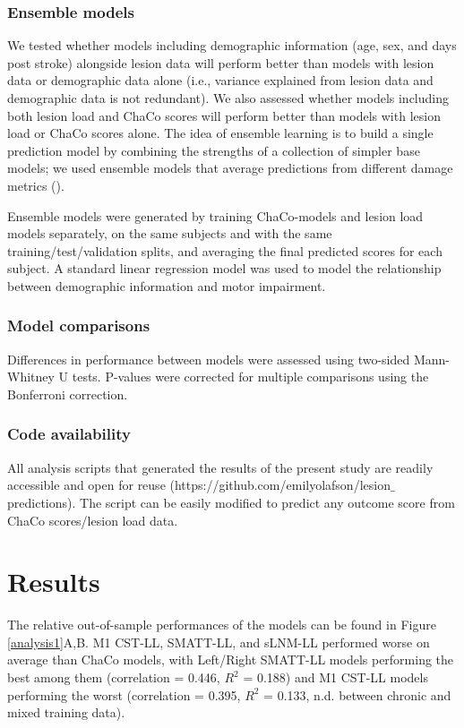 \documentclass[10pt]{article}
\begin{document}
\subsubsection*{Ensemble models}

We tested whether models including demographic information (age, sex, and days post stroke) alongside lesion data will perform better than models with lesion data or demographic data alone (i.e., variance explained from lesion data and demographic data is not redundant). We also assessed whether models including both lesion load and ChaCo scores will perform better than models with lesion load or ChaCo scores alone. The idea of ensemble learning is to build a single prediction model by combining the strengths of a collection of simpler base models; we used ensemble models that average predictions from different damage metrics (\cite{Hastie2001-or}).

Ensemble models were generated by training ChaCo-models and lesion load models separately, on the same subjects and with the same training/test/validation splits, and averaging the final predicted scores for each subject. A standard linear regression model was used to model the relationship between demographic information and motor impairment. 

\subsubsection*{Model comparisons}
Differences in performance between models were assessed using two-sided Mann-Whitney U tests. P-values were corrected for multiple comparisons using the Bonferroni correction. 

\subsubsection*{Code availability}
All analysis scripts that generated the results of the present study are readily accessible and open for reuse (https://github.com/emilyolafson/lesion$\_$predictions). The script can be easily modified to predict any outcome score from ChaCo scores/lesion load data.

\section{Results}
The relative out-of-sample performances of the models can be found in Figure \ref{analysis1}A,B. M1 CST-LL, SMATT-LL, and sLNM-LL performed worse on average than ChaCo models, with Left/Right SMATT-LL models performing the best among them (correlation = 0.446, $R^2$ = 0.188) and M1 CST-LL models performing the worst (correlation = 0.395, $R^2$ = 0.133, n.d. between chronic and mixed training data). 
\end{document}

